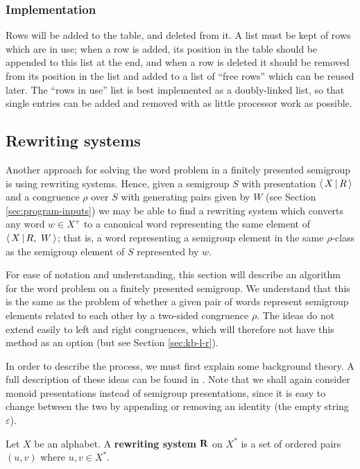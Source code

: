 \subsubsection{Implementation}

Rows will be added to the table, and deleted from it.  A list must be kept of
rows which are in use; when a row is added, its position in the table should be
appended to this list at the end, and when a row is deleted it should be removed
from its position in the list and added to a list of ``free rows'' which can be
reused later.  The ``rows in use'' list is best implemented as a doubly-linked
list, so that single entries can be added and removed with as little processor
work as possible.

\subsection{Rewriting systems}
\label{sec:kb}

Another approach for solving the word problem in a finitely presented semigroup
is using rewriting systems.  Hence, given a semigroup $S$ with presentation
$\left\langle\,X\,\middle|\,R\,\right\rangle$ and a congruence $\rho$ over $S$ with generating pairs given by $W$
(see Section \ref{sec:program-inputs})
we may be able to find a rewriting system which converts any word $w \in X^+$ to
a canonical word representing the same element of $\left\langle\,X\,\middle|\,R,\ W\,\right\rangle$;
that is, a word representing a semigroup element in the same $\rho$-class as
the semigroup element of $S$ represented by $w$.

For ease of notation and understanding, this section will describe an algorithm
for the word problem on a finitely presented semigroup.  We understand that this
is the same as the problem of whether a given pair of words represent semigroup
elements related to each other by a two-sided congruence $\rho$.  The ideas do
not extend easily to left and right congruences, which will therefore not have
this method as an option (but see Section \ref{sec:kb-l-r}).

In order
to describe the process, we must first explain some background theory.  A full
description of these ideas can be found in \cite[Section 12.2]{cgt}.  Note that
we shall again consider monoid presentations instead of semigroup presentations,
since it is easy to change between the two by appending or removing an identity
(the empty string $\varepsilon$).

\begin{definition}
  \label{def:rws}
  Let $X$ be an alphabet.  A \textbf{rewriting system} $\mathbf{R}$ on $X^*$ is a set
  of ordered pairs $(u,v)$ where $u, v \in X^*$.
\end{definition}


